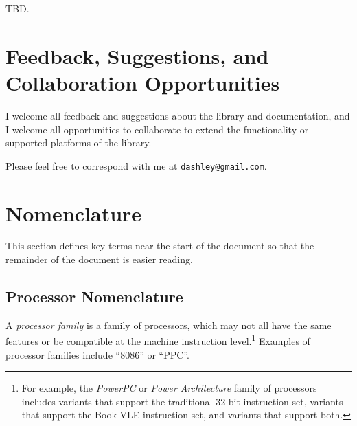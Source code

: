 TBD. 


\section{Feedback, Suggestions, and Collaboration Opportunities}
\label{ciov0:sfbk0}

I welcome all feedback and suggestions about the library and 
documentation, and I welcome all opportunities to collaborate to extend 
the functionality or supported platforms of the library.  

Please feel free to correspond with me at \texttt{dashley@\-gmail.com}.


\section{Nomenclature}
\label{ciov0:snom0}

This section defines key terms near the start of the 
document so that the remainder of the document is easier 
reading.  


\subsection{Processor Nomenclature}
\label{ciov0:snom0:sptr0}

A \emph{processor family} is a 
family of processors, which may not all have the same 
features or be compatible at the machine instruction 
level.\footnote{For example, the \emph{PowerPC} or 
\emph{Power Architecture} family of processors includes 
variants that support the traditional 32-bit instruction 
set, variants that support the Book VLE instruction set, and 
variants that support both.} Examples of processor families 
include ``8086'' or ``PPC''.  


